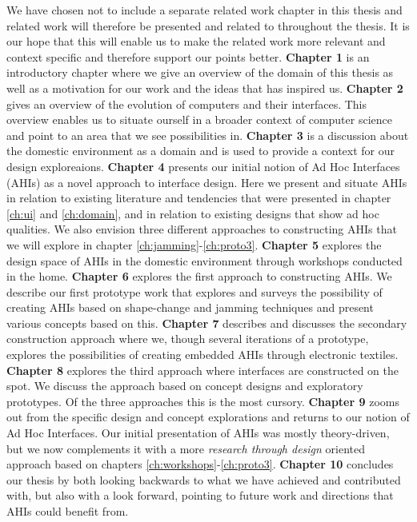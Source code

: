 We have chosen not to include a separate related work chapter in this thesis and related work will therefore be presented and related to throughout the thesis.
It is our hope that this will enable us to make the related work more relevant and context specific and therefore support our points better. 
\blank
\textbf{Chapter 1} is an introductory chapter where we give an overview of the domain of this thesis as well as a motivation for our work and the ideas that has inspired us.
\blank
\textbf{Chapter 2} gives an overview of the evolution of computers and their interfaces.
This overview enables us to situate ourself in a broader context of computer science and point to an area that we see possibilities in.  
\blank
\textbf{Chapter 3} is a discussion about the domestic environment as a domain and is used to provide a context for our design exploreaions. 
\blank
\textbf{Chapter 4} presents our initial notion of Ad Hoc Interfaces (AHIs) as a novel approach to interface design.
Here we present and situate AHIs in relation to existing literature and tendencies that were presented in chapter \ref{ch:ui} and \ref{ch:domain}, and in relation to existing designs that show ad hoc qualities.
We also envision three different approaches to constructing AHIs that we will explore in chapter \ref{ch:jamming}-\ref{ch:proto3}.
\blank
\textbf{Chapter 5} explores the design space of AHIs in the domestic environment through workshops conducted in the home.
\blank
\textbf{Chapter 6} explores the first approach to constructing AHIs. 
We describe our first prototype work that explores and surveys the possibility of creating AHIs based on shape-change and jamming techniques and present various concepts based on this.
\blank
\textbf{Chapter 7} describes and discusses the secondary construction approach where we, though several iterations of a prototype, explores the possibilities of creating embedded AHIs through electronic textiles.
\blank
\textbf{Chapter 8} explores the third approach where interfaces are constructed on the spot.
We discuss the approach based on concept designs and exploratory prototypes. 
Of the three approaches this is the most cursory.
\blank
\textbf{Chapter 9} zooms out from the specific design and concept explorations and returns to our notion of Ad Hoc Interfaces.
Our initial presentation of AHIs was mostly theory-driven, but we now complements it with a more \emph{research through design} oriented approach based on chapters \ref{ch:workshops}-\ref{ch:proto3}. 
\blank
\textbf{Chapter 10} concludes our thesis by both looking backwards to what we have achieved and contributed with, but also with a look forward, pointing to future work and directions that AHIs could benefit from.